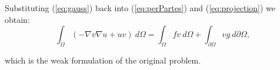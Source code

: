 \documentclass[unicode,11pt,a4paper,oneside,numbers=endperiod,openany]{scrartcl}
\begin{document}
Substituting (\ref{eq:gauss}) back into (\ref{eq:perPartes}) and (\ref{eq:projection})
we obtain:
\begin{equation}
    \int_{\Omega} (- \nabla v \nabla u + uv) \ d\Omega = 
    \int_{\Omega} f v \ d\Omega + \int_{\partial \Omega}  v g \ d\partial\Omega,
\end{equation}

which is the weak formulation of the original problem.
\end{document}
